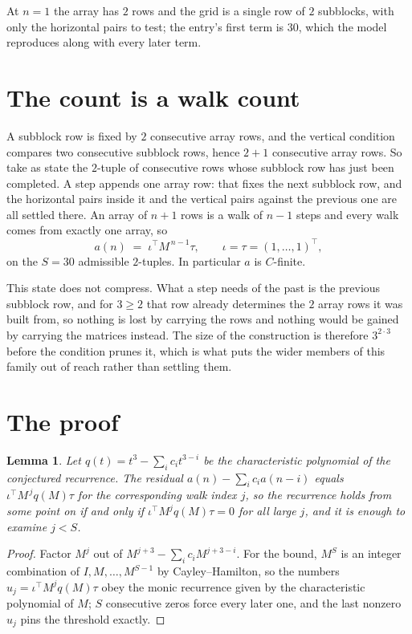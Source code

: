 \documentclass[11pt,a4paper]{article}
\theoremstyle{plain}
\newtheorem{lemma}[theorem]{Lemma}
\theoremstyle{definition}
\begin{document}
At $n=1$ the array has $2$ rows and the grid is a single row of $2$
subblocks, with only the horizontal pairs to test; the entry's first term is
$30$, which the model reproduces along with every later term.

\section{The count is a walk count}

A subblock row is fixed by $2$ consecutive array rows, and the vertical condition compares
two consecutive subblock rows, hence $2+1$ consecutive array rows. So take as state the
$2$-tuple of consecutive rows whose subblock row has just been completed. A step appends one
array row: that fixes the next subblock row, and the horizontal pairs inside it and the
vertical pairs against the previous one are all settled there. An array of $n+1$ rows is
a walk of $n-1$ steps and every walk comes from exactly one array, so
\[
a(n)\;=\;\iota^{\!\top}M^{\,n-1}\tau,\qquad\iota=\tau=(1,\dots,1)^{\!\top},
\]
on the $S=30$ admissible $2$-tuples. In particular $a$ is $C$-finite.

This state does not compress. What a step needs of the past is the previous subblock row, and
for $3\ge2$ that row already determines the $2$ array rows it was built from, so nothing
is lost by carrying the rows and nothing would be gained by carrying the matrices instead. The
size of the construction is therefore $3^{2\cdot3}$ before the condition prunes
it, which is what puts the wider members of this family out of reach rather than settling them.

\section{The proof}

\begin{lemma}\label{lem:crit}
Let $q(t)=t^{3}-\sum_i c_it^{3-i}$ be the characteristic polynomial of the
conjectured recurrence. The residual $a(n)-\sum_ic_ia(n-i)$ equals
$\iota^{\!\top}M^{\,j}q(M)\tau$ for the corresponding walk index $j$, so the recurrence
holds from some point on if and only if $\iota^{\!\top}M^{j}q(M)\tau=0$ for all large $j$,
and it is enough to examine $j<S$.
\end{lemma}

\begin{proof}
Factor $M^{j}$ out of $M^{j+3}-\sum_ic_iM^{j+3-i}$. For the bound, $M^{S}$
is an integer combination of $I,M,\dots,M^{S-1}$ by Cayley--Hamilton, so the numbers
$u_j=\iota^{\!\top}M^{j}q(M)\tau$ obey the monic recurrence given by the characteristic
polynomial of $M$; $S$ consecutive zeros force every later one, and the last nonzero $u_j$
pins the threshold exactly.
\end{proof}
\end{document}
